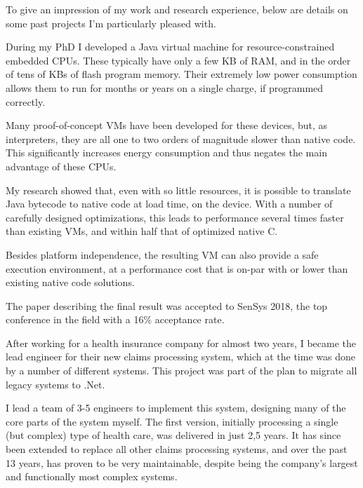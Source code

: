 \documentclass[10pt,a4paper]{../altacv}
\begin{document}
\begin{fullwidth}

To give an impression of my work and research experience, below are details on some past projects I’m particularly pleased with.

\bigskip


During my PhD I developed a Java virtual machine for resource-constrained embedded CPUs. These typically have only a few KB of RAM, and in the order of tens of KBs of flash program memory. Their extremely low power consumption allows them to run for months or years on a single charge, if programmed correctly.

Many proof-of-concept VMs have been developed for these devices, but, as interpreters, they are all one to two orders of magnitude slower than native code. This significantly increases energy consumption and thus negates the main advantage of these CPUs.

My research showed that, even with so little resources, it is possible to translate Java bytecode to native code at load time, on the device. With a number of carefully designed optimizations, this leads to performance several times faster than existing VMs, and within half that of optimized native C.

Besides platform independence, the resulting VM can also provide a safe execution environment, at a performance cost that is on-par with or lower than existing native code solutions.

The paper describing the final result was accepted to SenSys 2018, the top conference in the field with a 16\% acceptance rate.


After working for a health insurance company for almost two years, I became the lead engineer for their new claims processing system, which at the time was done by a number of different systems. This project was part of the plan to migrate all legacy systems to .Net.

\medskip

I lead a team of 3-5 engineers to implement this system, designing many of the core parts of the system myself. The first version, initially processing a single (but complex) type of health care, was delivered in just 2,5 years. It has since been extended to replace all other claims processing systems, and over the past 13 years, has proven to be very maintainable, despite being the company’s largest and functionally most complex systems.


\end{fullwidth}
\end{document}

